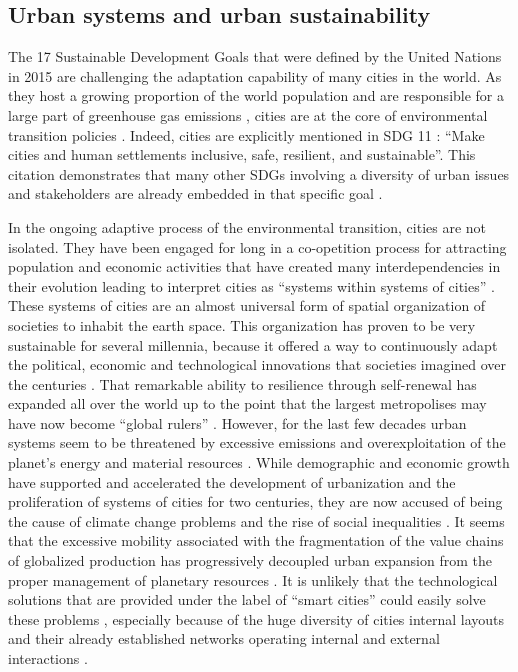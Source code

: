 \documentclass[final,5p,times,twocolumn,authoryear]{elsarticle}
\begin{document}
\subsection{Urban systems and urban sustainability}

The 17 Sustainable Development Goals that were defined by the United Nations in 2015 \citep{nations2015sustainable} are challenging the adaptation capability of many cities in the world. As they host a growing proportion of the world population and are responsible for a large part of greenhouse gas emissions \citep{christen2014atmospheric}, cities are at the core of environmental transition policies \citep{romero2011cities}. Indeed, cities are explicitly mentioned in SDG 11 \citep{nations2015sustainable}: ``Make cities and human settlements inclusive, safe, resilient, and sustainable''. This citation demonstrates that many other SDGs involving a diversity of urban issues and stakeholders are already embedded in that specific goal \citep{vaidya2020sdg}.

In the ongoing adaptive process of the environmental transition, cities are not isolated. They have been engaged for long in a co-opetition process for attracting population and economic activities that have created many interdependencies in their evolution leading to interpret cities as ``systems within systems of cities'' \citep{berry1964cities}. These systems of cities are an almost universal form of spatial organization of societies to inhabit the earth space. This organization has proven to be very sustainable for several millennia, because it offered a way to continuously adapt the political, economic and technological innovations that societies imagined over the centuries \citep{pumain2020theories}. That remarkable ability to resilience through self-renewal has expanded all over the world up to the point that the largest metropolises may have now become ``global rulers'' \citep{glaeser2020urban}. However, for the last few decades urban systems seem to be threatened by excessive emissions and overexploitation of the planet's energy and material resources \citep{nijkamp2014sustainable,kourtit2020global}. While demographic and economic growth have supported and accelerated the development of urbanization and the proliferation of systems of cities for two centuries, they are now accused of being the cause of climate change problems and the rise of social inequalities \citep{davis2006planet,glaeser2009inequality}. It seems that the excessive mobility associated with the fragmentation of the value chains of globalized production has progressively decoupled urban expansion from the proper management of planetary resources \citep{rozenblat2018urban}. It is unlikely that the technological solutions that are provided under the label of ``smart cities'' could easily solve these problems \citep{caragliu2011smart,kourtit2020global}, especially because of the huge diversity of cities internal layouts and their already established networks operating internal and external interactions \citep{caruso2022no}.
\end{document}
